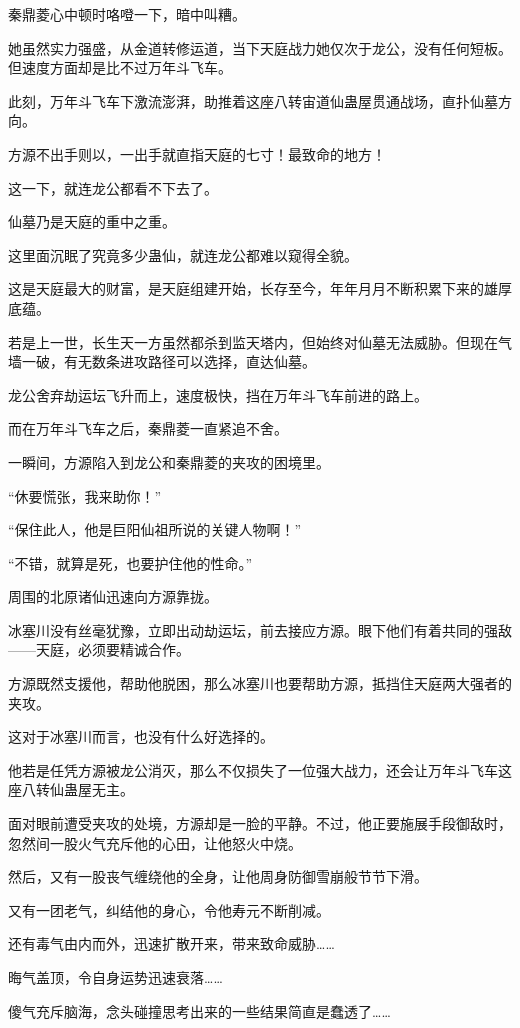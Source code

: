 \begin{this_body}
秦鼎菱心中顿时咯噔一下，暗中叫糟。

她虽然实力强盛，从金道转修运道，当下天庭战力她仅次于龙公，没有任何短板。但速度方面却是比不过万年斗飞车。

此刻，万年斗飞车下激流澎湃，助推着这座八转宙道仙蛊屋贯通战场，直扑仙墓方向。

方源不出手则以，一出手就直指天庭的七寸！最致命的地方！

这一下，就连龙公都看不下去了。

仙墓乃是天庭的重中之重。

这里面沉眠了究竟多少蛊仙，就连龙公都难以窥得全貌。

这是天庭最大的财富，是天庭组建开始，长存至今，年年月月不断积累下来的雄厚底蕴。

若是上一世，长生天一方虽然都杀到监天塔内，但始终对仙墓无法威胁。但现在气墙一破，有无数条进攻路径可以选择，直达仙墓。

龙公舍弃劫运坛飞升而上，速度极快，挡在万年斗飞车前进的路上。

而在万年斗飞车之后，秦鼎菱一直紧追不舍。

一瞬间，方源陷入到龙公和秦鼎菱的夹攻的困境里。

“休要慌张，我来助你！”

“保住此人，他是巨阳仙祖所说的关键人物啊！”

“不错，就算是死，也要护住他的性命。”

周围的北原诸仙迅速向方源靠拢。

冰塞川没有丝毫犹豫，立即出动劫运坛，前去接应方源。眼下他们有着共同的强敌——天庭，必须要精诚合作。

方源既然支援他，帮助他脱困，那么冰塞川也要帮助方源，抵挡住天庭两大强者的夹攻。

这对于冰塞川而言，也没有什么好选择的。

他若是任凭方源被龙公消灭，那么不仅损失了一位强大战力，还会让万年斗飞车这座八转仙蛊屋无主。

面对眼前遭受夹攻的处境，方源却是一脸的平静。不过，他正要施展手段御敌时，忽然间一股火气充斥他的心田，让他怒火中烧。

然后，又有一股丧气缠绕他的全身，让他周身防御雪崩般节节下滑。

又有一团老气，纠结他的身心，令他寿元不断削减。

还有毒气由内而外，迅速扩散开来，带来致命威胁……

晦气盖顶，令自身运势迅速衰落……

傻气充斥脑海，念头碰撞思考出来的一些结果简直是蠢透了……


\end{this_body}
